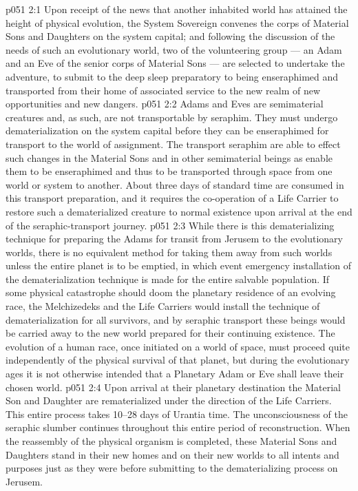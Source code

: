 \vs p051 2:1 Upon receipt of the news that another inhabited world has attained the height of physical evolution, the System Sovereign convenes the corps of Material Sons and Daughters on the system capital; and following the discussion of the needs of such an evolutionary world, two of the volunteering group --- an Adam and an Eve of the senior corps of Material Sons --- are selected to undertake the adventure, to submit to the deep sleep preparatory to being enseraphimed and transported from their home of associated service to the new realm of new opportunities and new dangers.
\vs p051 2:2 Adams and Eves are semimaterial creatures and, as such, are not transportable by seraphim. They must undergo dematerialization on the system capital before they can be enseraphimed for transport to the world of assignment. The transport seraphim are able to effect such changes in the Material Sons and in other semimaterial beings as enable them to be enseraphimed and thus to be transported through space from one world or system to another. About three days of standard time are consumed in this transport preparation, and it requires the co\hyp{}operation of a Life Carrier to restore such a dematerialized creature to normal existence upon arrival at the end of the seraphic\hyp{}transport journey.
\vs p051 2:3 \pc While there is this dematerializing technique for preparing the Adams for transit from Jerusem to the evolutionary worlds, there is no equivalent method for taking them away from such worlds unless the entire planet is to be emptied, in which event emergency installation of the dematerialization technique is made for the entire salvable population. If some physical catastrophe should doom the planetary residence of an evolving race, the Melchizedeks and the Life Carriers would install the technique of dematerialization for all survivors, and by seraphic transport these beings would be carried away to the new world prepared for their continuing existence. The evolution of a human race, once initiated on a world of space, must proceed quite independently of the physical survival of that planet, but during the evolutionary ages it is not otherwise intended that a Planetary Adam or Eve shall leave their chosen world.
\vs p051 2:4 \pc Upon arrival at their planetary destination the Material Son and Daughter are rematerialized under the direction of the Life Carriers. This entire process takes 10--28 days of Urantia time. The unconsciousness of the seraphic slumber continues throughout this entire period of reconstruction. When the reassembly of the physical organism is completed, these Material Sons and Daughters stand in their new homes and on their new worlds to all intents and purposes just as they were before submitting to the dematerializing process on Jerusem.
